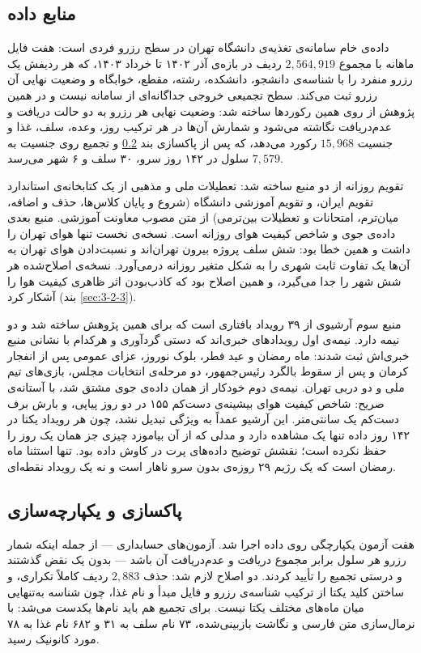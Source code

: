 \subsection{منابع داده}
\label{sec:3-3-1}

داده‌ی خام سامانه‌ی تغذیه‌ی دانشگاه تهران در سطح رزرو فردی است: هفت فایل ماهانه با مجموع
$2{,}564{,}919$ ردیف در بازه‌ی آذر ۱۴۰۲ تا خرداد ۱۴۰۳، که هر ردیفش یک رزرو منفرد را با
شناسه‌ی دانشجو، دانشکده، رشته، مقطع، خوابگاه و وضعیت نهایی آن رزرو ثبت می‌کند. سطح
تجمیعی خروجی جداگانه‌ای از سامانه نیست و در همین پژوهش از روی همین رکوردها ساخته شد:
وضعیت نهایی هر رزرو به دو حالت دریافت و عدم‌دریافت نگاشته می‌شود و شمارش آن‌ها در هر
ترکیب روز، وعده، سلف، غذا و جنسیت $15{,}968$ رکورد می‌دهد، که پس از پاکسازی بند
\ref{sec:3-3-2} و تجمیع روی جنسیت به $7{,}579$ سلول در ۱۴۲ روز سرو، ۳۰ سلف و ۶ شهر
می‌رسد.

تقویم روزانه از دو منبع ساخته شد: تعطیلات ملی و مذهبی از یک کتابخانه‌ی استاندارد تقویم
ایران، و تقویم آموزشی دانشگاه (شروع و پایان کلاس‌ها، حذف و اضافه، میان‌ترم، امتحانات و
تعطیلات بین‌ترمی) از متن مصوب معاونت آموزشی. منبع بعدی داده‌ی جوی و شاخص کیفیت هوای
روزانه است. نسخه‌ی نخست تنها هوای تهران را داشت و همین خطا بود: شش سلف پروژه بیرون
تهران‌اند و نسبت‌دادن هوای تهران به آن‌ها یک تفاوت ثابت شهری را به شکل متغیر روزانه
درمی‌آورد. نسخه‌ی اصلاح‌شده هر شش شهر را جدا می‌گیرد، و همین اصلاح بود که کاذب‌بودن اثر
ظاهری کیفیت هوا را آشکار کرد (بند \ref{sec:3-2-3}).

منبع سوم آرشیوی از ۳۹ رویداد بافتاری است که برای همین پژوهش ساخته شد و دو نیمه دارد.
نیمه‌ی اول رویدادهای خبری‌اند که دستی گردآوری و هرکدام با نشانی منبع خبری‌اش ثبت شدند:
ماه رمضان و عید فطر، بلوک نوروز، عزای عمومی پس از انفجار کرمان و پس از سقوط بالگرد
رئیس‌جمهور، دو مرحله‌ی انتخابات مجلس، بازی‌های تیم ملی و دو دربی تهران. نیمه‌ی دوم خودکار
از همان داده‌ی جوی مشتق شد، با آستانه‌ی صریح: شاخص کیفیت هوای بیشینه‌ی دست‌کم ۱۵۵ در دو
روز پیاپی، و بارش برف دست‌کم یک سانتی‌متر. این آرشیو عمداً به ویژگی تبدیل نشد، چون هر
رویداد یکتا در ۱۴۲ روز داده تنها یک مشاهده دارد و مدلی که از آن بیاموزد چیزی جز همان یک
روز را حفظ نکرده است؛ نقشش توضیح داده‌های پرت در کاوش داده بود. تنها استثنا ماه رمضان
است که یک رژیم ۲۹ روزه‌ی بدون سرو ناهار است و نه یک رویداد نقطه‌ای.

\subsection{پاکسازی و یکپارچه‌سازی}
\label{sec:3-3-2}

هفت آزمون یکپارچگی روی داده اجرا شد. آزمون‌های حسابداری — از جمله اینکه شمار رزرو هر
سلول برابر مجموع دریافت و عدم‌دریافت آن باشد — بدون یک نقض گذشتند و درستی تجمیع را
تأیید کردند. دو اصلاح لازم شد: حذف $2{,}883$ ردیف کاملاً تکراری، و ساختن کلید یکتا از
ترکیب شناسه‌ی رزرو و فایل مبدأ و نام غذا، چون شناسه به‌تنهایی میان ماه‌های مختلف یکتا
نیست. برای تجمیع هم باید نام‌ها یکدست می‌شد: با نرمال‌سازی متن فارسی و نگاشت
بازبینی‌شده، ۷۳ نام سلف به ۳۱ و ۶۸۲ نام غذا به ۷۸ مورد کانونیک رسید.

